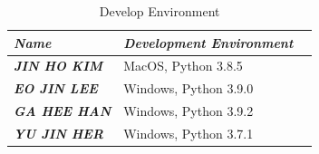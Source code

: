 \documentclass[conference]{IEEEtran}
\begin{document}
\begin{table}[ht]
    \centering
    \begin{tabularx}{\columnwidth}{X|X}
    \hline
    \textit{\textbf{Name}} & \textit{\textbf{Development Environment}}
     & & \\ \hline
    \textit{\textbf{JIN HO KIM}} & MacOS, Python 3.8.5    
     & & \\ \hline
    \textit{\textbf{EO JIN LEE}} & Windows, Python 3.9.0
     & & \\ \hline
    \textit{\textbf{GA HEE HAN}} & Windows, Python 3.9.2
     & & \\ \hline
    \textit{\textbf{YU JIN HER}} & Windows, Python 3.7.1
     & & \\ \hline
    \end{tabularx}
    \renewcommand{\thetable}{\arabic{table}}
    \caption{Develop Environment}
    \label{tab:table}
\end{table}
\break
\end{document}
